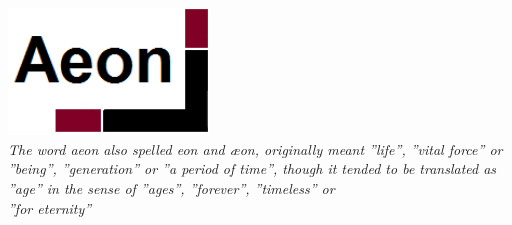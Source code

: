 \vspace*{\fill}

\begin{minipage}{1\linewidth}
\begin{center}

	\includegraphics[width=0.4\textwidth]{../Templates/Aeonbig.png}\\[2cm]
	
\emph{The word aeon also spelled eon and æon, originally meant ''life'', ''vital force'' or ''being'', ''generation'' or ''a period of time'', though it tended to be translated as ''age'' in the sense of ''ages'', ''forever'', ''timeless'' or \\ ''for eternity''} %

\end{center}
\end{minipage}
\vspace*{\fill}

\clearpage

